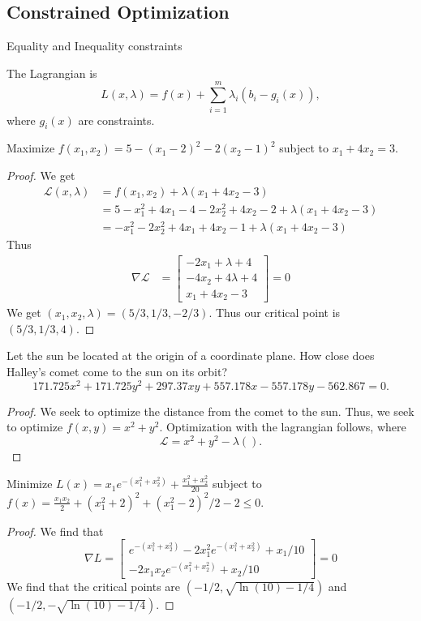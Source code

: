 \documentclass[12pt]{scrartcl}
\begin{document}
\subsection{Constrained Optimization}
Equality and Inequality constraints
\begin{definition}
    The \alert{Lagrangian} is
    $$L(x,\lambda) = f(x) + \sum_{i=1}^{m} \lambda_i (b_i-g_i(x)),$$
    where $g_i(x)$ are constraints. 
\end{definition}
\begin{example}
    Maximize $f(x_1,x_2)=5-(x_1-2)^2-2(x_2-1)^2$ subject to $x_1+4x_2=3$. 
\end{example}
\begin{proof}
    We get
    \begin{align*}
        \mathcal{L}(x,\lambda) &= f(x_1,x_2) +\lambda(x_1+4x_2-3) \\
          &= 5-x_1^2+4x_1-4-2x_2^2+4x_2-2 +\lambda(x_1+4x_2-3)\\
          &=-x_1^2-2x_2^2+4x_1+4x_2-1+\lambda(x_1+4x_2-3)
    \end{align*}
    Thus
    \begin{align*}
        \nabla \mathcal{L} &= \begin{bmatrix} -2x_1+\lambda+4 \\ -4x_2+4\lambda+4 \\ x_1+4x_2-3\end{bmatrix}=0
    \end{align*}
    We get $(x_1,x_2,\lambda) = (5/3, 1/3,-2/3)$. Thus our critical point is
    $\boxed{(5/3, 1/3, 4)}.$
\end{proof}
\begin{example}
    Let the sun be located at the origin of a coordinate plane. How close
    does Halley's comet come to the sun on its orbit?
    $$171.725x^2+171.725y^2+297.37xy+557.178x-557.178y-562.867=0.$$
\end{example}
\begin{proof}
    We seek to optimize the distance from the comet to the sun. Thus,
    we seek to optimize $f(x,y)=x^2+y^2$. Optimization with the lagrangian
    follows, where
    $$\mathcal{L} = x^2+y^2-\lambda().$$
\end{proof}
\begin{example}
    Minimize $L(x)=x_1e^{-(x_1^2+x_2^2)}+\frac{x_1^2+x_2^2}{20}$ subject to 
    $f(x) = \frac{x_1x_2}{2}+(x_1^2+2)^2+(x_1^2-2)^2/2-2\leq 0$.
\end{example}
\begin{proof}
    We find that
    $$\nabla L = 
    \begin{bmatrix} e^{-(x_1^2+x_2^2)}-2x_1^2e^{-(x_1^2+x_2^2)} +x_1/10\\ 
    -2x_1x_2e^{-(x_1^2+x_2^2)}+x_2/10 \end{bmatrix}=0$$
    We find that the critical points are $(-1/2,\sqrt{\ln(10)-1/4})$ and
    $(-1/2,-\sqrt{\ln(10)-1/4})$.
\end{proof}
\end{document}

